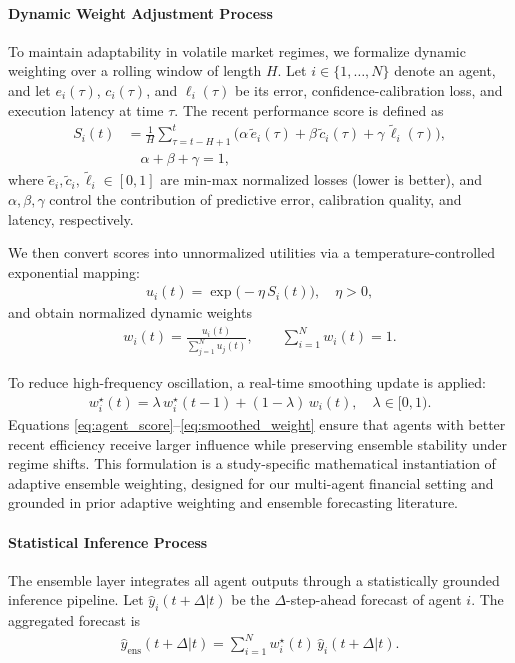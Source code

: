 \documentclass{ieeeaccess}
\begin{document}
\paragraph{Dynamic Weight Adjustment Process}
To maintain adaptability in volatile market regimes, we formalize dynamic weighting over a rolling window of length $H$. Let $i \in \{1,\dots,N\}$ denote an agent, and let $e_i(\tau)$, $c_i(\tau)$, and $\ell_i(\tau)$ be its error, confidence-calibration loss, and execution latency at time $\tau$. The recent performance score is defined as
\begin{align}
S_i(t) &= \frac{1}{H}\sum_{\tau=t-H+1}^{t}
\Big(
\alpha\,\tilde e_i(\tau) + \beta\,\tilde c_i(\tau) + \gamma\,\tilde \ell_i(\tau)
\Big), \nonumber\\
&\quad \alpha+\beta+\gamma=1,
\label{eq:agent_score}
\end{align}
where $\tilde e_i,\tilde c_i,\tilde \ell_i \in [0,1]$ are min-max normalized losses (lower is better), and $\alpha,\beta,\gamma$ control the contribution of predictive error, calibration quality, and latency, respectively.

We then convert scores into unnormalized utilities via a temperature-controlled exponential mapping:
\begin{align}
u_i(t) = \exp\!\big(-\eta\,S_i(t)\big), \quad \eta>0,
\label{eq:agent_utility}
\end{align}
and obtain normalized dynamic weights
\begin{align}
w_i(t)=\frac{u_i(t)}{\sum_{j=1}^{N}u_j(t)}, \qquad \sum_{i=1}^{N}w_i(t)=1.
\label{eq:dynamic_weight}
\end{align}

To reduce high-frequency oscillation, a real-time smoothing update is applied:
\begin{align}
w_i^{\star}(t)=\lambda\,w_i^{\star}(t-1)+(1-\lambda)\,w_i(t), \quad \lambda\in[0,1).
\label{eq:smoothed_weight}
\end{align}
Equations \eqref{eq:agent_score}--\eqref{eq:smoothed_weight} ensure that agents with better recent efficiency receive larger influence while preserving ensemble stability under regime shifts\cite{McAndrew2021,Lu2023}.
This formulation is a study-specific mathematical instantiation of adaptive ensemble weighting, designed for our multi-agent financial setting and grounded in prior adaptive weighting and ensemble forecasting literature\cite{McAndrew2021,Lu2023,li2022}.

\paragraph{Statistical Inference Process}
The ensemble layer integrates all agent outputs through a statistically grounded inference pipeline. Let $\hat y_i(t+\Delta|t)$ be the $\Delta$-step-ahead forecast of agent $i$. The aggregated forecast is
\begin{align}
\hat y_{\text{ens}}(t+\Delta|t)=\sum_{i=1}^{N}w_i^{\star}(t)\,\hat y_i(t+\Delta|t).
\label{eq:ensemble_forecast}
\end{align}
\end{document}
